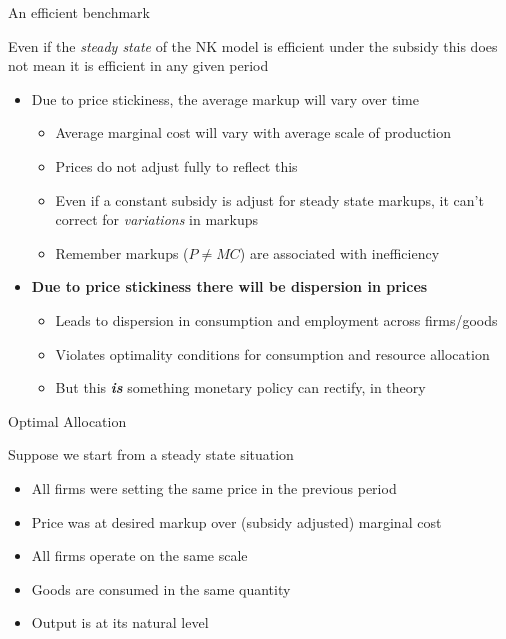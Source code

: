 \begin{frame}{An efficient benchmark}

Even if the \emph{steady state} of the NK model is efficient under the subsidy this does not mean it is efficient in any given period

\vspace{2mm}
\begin{itemize}
\item	Due to price stickiness, the average markup will vary over time
	\begin{itemize}
	\item	Average marginal cost will vary with average scale of production
	\item	Prices do not adjust fully to reflect this
	\item	Even if a constant subsidy is adjust for steady state markups, it can't correct for \textit{variations} in markups
	\item	Remember markups ($P \neq MC$) are associated with inefficiency
	\end{itemize}
	\vspace{2mm}
\item	\textbf{Due to price stickiness there will be dispersion in prices}
	\begin{itemize}
	\item	Leads to dispersion in consumption and employment across firms/goods
	\item	Violates optimality conditions for consumption and resource allocation
	\item	But this \textbf{\textit{is}} something monetary policy can rectify, in theory
	\end{itemize}
\end{itemize}

\end{frame}


	
\begin{frame}{Optimal Allocation}

Suppose we start from a steady state situation
\begin{itemize}
\item	All firms were setting the same price in the previous period
\item	Price was at desired markup over (subsidy adjusted) marginal cost
\item	All firms operate on the same scale
\item	Goods are consumed in the same quantity
\item	Output is at its natural level
\end{itemize}

\end{frame}

